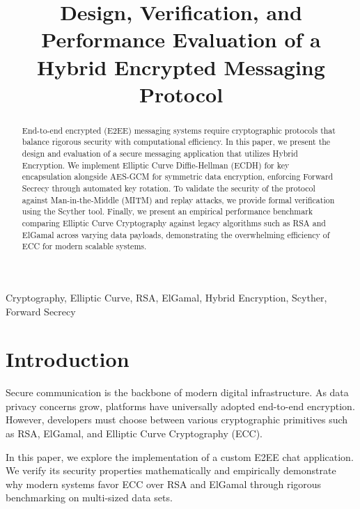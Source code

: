 \documentclass[conference]{IEEEtran}
\begin{document}
\title{Design, Verification, and Performance Evaluation of a Hybrid Encrypted Messaging Protocol}

\author{
}

\maketitle

\begin{abstract}
End-to-end encrypted (E2EE) messaging systems require cryptographic protocols that balance rigorous security with computational efficiency. In this paper, we present the design and evaluation of a secure messaging application that utilizes Hybrid Encryption. We implement Elliptic Curve Diffie-Hellman (ECDH) for key encapsulation alongside AES-GCM for symmetric data encryption, enforcing Forward Secrecy through automated key rotation. To validate the security of the protocol against Man-in-the-Middle (MITM) and replay attacks, we provide formal verification using the Scyther tool. Finally, we present an empirical performance benchmark comparing Elliptic Curve Cryptography against legacy algorithms such as RSA and ElGamal across varying data payloads, demonstrating the overwhelming efficiency of ECC for modern scalable systems.
\end{abstract}

\begin{IEEEkeywords}
Cryptography, Elliptic Curve, RSA, ElGamal, Hybrid Encryption, Scyther, Forward Secrecy
\end{IEEEkeywords}

\section{Introduction}
Secure communication is the backbone of modern digital infrastructure. As data privacy concerns grow, platforms have universally adopted end-to-end encryption. However, developers must choose between various cryptographic primitives such as RSA, ElGamal, and Elliptic Curve Cryptography (ECC). 

In this paper, we explore the implementation of a custom E2EE chat application. We verify its security properties mathematically and empirically demonstrate why modern systems favor ECC over RSA and ElGamal through rigorous benchmarking on multi-sized data sets.
\end{document}
